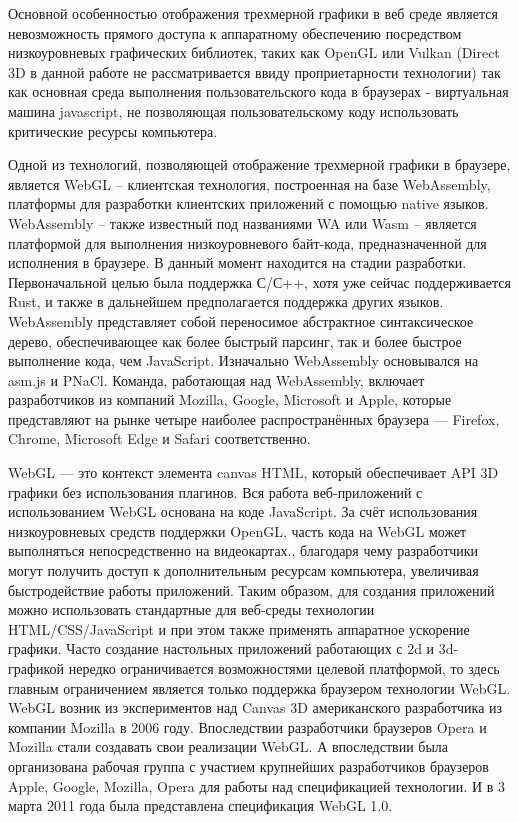 Основной особенностью отображения трехмерной графики в веб среде является невозможность прямого доступа к аппаратному обеспечению
посредством низкоуровневых графических библиотек, таких как OpenGL или Vulkan (Direct 3D в данной работе не рассматривается ввиду
проприетарности технологии) так как основная среда выполнения пользовательского кода в браузерах - виртуальная машина javascript,
не позволяющая пользовательскому коду использовать критические ресурсы компьютера.

Одной из технологий, позволяющей отображение трехмерной графики в браузере, является WebGL -- клиентская технология, построенная на базе
WebAssembly, платформы для разработки клиентских приложений с помощью native языков. WebAssembly -- также известный под названиями WA
или Wasm -- является платформой для выполнения низкоуровневого байт-кода, предназначенной для исполнения в браузере. В данный момент находится
на стадии разработки. Первоначальной целью была поддержка С/С++, хотя уже сейчас поддерживается Rust, и также в дальнейшем предполагается
поддержка других языков. WebAssemblу представляет собой переносимое абстрактное синтаксическое дерево, обеспечивающее как более быстрый парсинг,
так и более быстрое выполнение кода, чем JavaScript. Изначально WebAssembly основывался на asm.js и PNaCl. Команда, работающая над WebAssembly,
включает разработчиков из компаний Mozilla, Google, Microsoft и Apple, которые представляют на рынке четыре наиболее распространённых браузера — Firefox,
Chrome, Microsoft Edge и Safari соответственно.

WebGL — это контекст элемента canvas HTML, который обеспечивает API 3D графики без использования плагинов. Вся работа веб-приложений с использованием WebGL основана на коде JavaScript.
За счёт использования низкоуровневых средств поддержки OpenGL, часть кода на WebGL может выполняться непосредственно на видеокартах., благодаря чему разработчики могут получить доступ
к дополнительным ресурсам компьютера, увеличивая быстродействие работы приложений.
Таким образом, для создания приложений можно использовать стандартные для веб-среды технологии HTML/CSS/JavaScript и при этом также применять аппаратное ускорение графики.
Часто создание настольных приложений работающих с 2d и 3d-графикой нередко ограничивается возможностями целевой платформой, то здесь главным ограничением является только поддержка
браузером технологии WebGL. 
WebGL возник из экспериментов над Canvas 3D американского разработчика из компании Mozilla в 2006 году. Впоследствии разработчики браузеров Opera и Mozilla стали создавать свои
реализации WebGL. А впоследствии была организована рабочая группа с участием крупнейших разработчиков браузеров Apple, Google, Mozilla, Opera для работы над спецификацией
технологии. И в 3 марта 2011 года была представлена спецификация WebGL 1.0.

